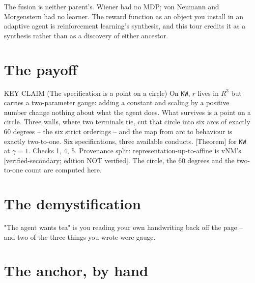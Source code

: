 The fusion is neither parent's. Wiener had no MDP; von Neumann and Morgenstern had no learner. The reward function as an object you install in an adaptive agent is reinforcement learning's synthesis, and this tour credits it as a synthesis rather than as a discovery of either ancestor.

\section*{The payoff}

\begin{whybox}{KEY CLAIM (The specification is a point on a circle)}
On \texttt{KW}, $r$ lives in $R^3$ but carries a two-parameter gauge: adding a constant and scaling by a positive number change nothing about what the agent does. What survives is a point on a circle. Three walls, where two terminals tie, cut that circle into six arcs of exactly 60 degrees -- the six strict orderings -- and the map from arc to behaviour is exactly two-to-one. Six specifications, three available conducts. [Theorem] for \texttt{KW} at $\gamma = 1$. Checks 1, 4, 5.
Provenance split: representation-up-to-affine is vNM's [verified-secondary; edition NOT verified]. The circle, the 60 degrees and the two-to-one count are computed here.
\end{whybox}

\section*{The demystification}

\begin{whyboxnt}
"The agent wants tea" is you reading your own handwriting back off the page -- and two of the three things you wrote were gauge.
\end{whyboxnt}

\section*{The anchor, by hand}

